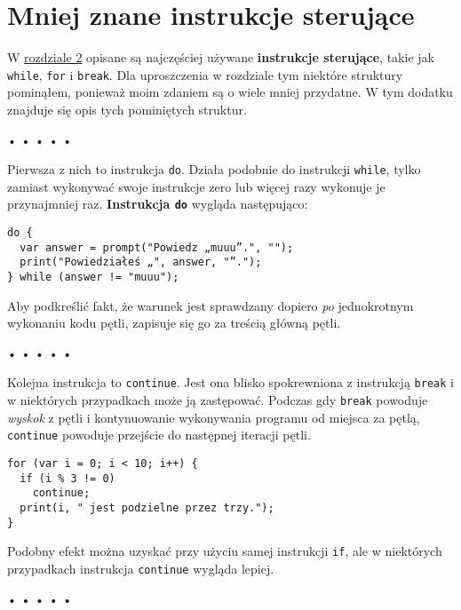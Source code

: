 \chapter{Mniej znane instrukcje sterujące}
\label{app:1}

W \hyperref[chap:2]{rozdziale 2} opisane są najczęściej używane \textbf{instrukcje sterujące}, takie jak \texttt{while}, \texttt{for} i \texttt{break}. Dla uproszczenia w rozdziale tym niektóre struktury pominąłem, ponieważ moim zdaniem są o wiele mniej przydatne. W tym dodatku znajduje się opis tych pominiętych struktur.


\begin{center} 
 • • • • • 
\end{center}

  
Pierwsza z nich to instrukcja \texttt{do}. Działa podobnie do instrukcji \texttt{while}, tylko zamiast wykonywać swoje instrukcje zero lub więcej razy wykonuje je przynajmniej raz. \textbf{Instrukcja \texttt{do}} wygląda następująco:

\begin{verbatim} 
do {
  var answer = prompt("Powiedz „muuu”.", "");
  print("Powiedziałeś „", answer, "”.");
} while (answer != "muuu");
\end{verbatim}
  
Aby podkreślić fakt, że warunek jest sprawdzany dopiero \emph{po} jednokrotnym wykonaniu kodu pętli, zapisuje się go za treścią główną pętli.


\begin{center} 
 • • • • • 
\end{center}

  
Kolejna instrukcja to \texttt{continue}. Jest ona blisko spokrewniona z instrukcją \texttt{break} i w niektórych przypadkach może ją zastępować. Podczas gdy \texttt{break} powoduje \emph{wyskok} z pętli i kontynuowanie wykonywania programu od miejsca za pętlą, \texttt{continue} powoduje przejście do następnej iteracji pętli.

\begin{verbatim} 
for (var i = 0; i < 10; i++) {
  if (i % 3 != 0)
    continue;
  print(i, " jest podzielne przez trzy.");
}
\end{verbatim}
  
Podobny efekt można uzyskać przy użyciu samej instrukcji \texttt{if}, ale w niektórych przypadkach instrukcja \texttt{continue} wygląda lepiej.


\begin{center} 
 • • • • • 
\end{center}

